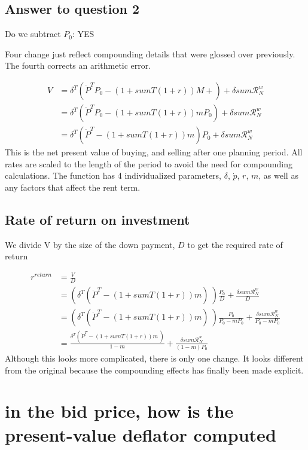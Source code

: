 \subsection{Answer to question 2} 
Do we subtract $P_0$: YES 

Four change just reflect compounding details that were glossed over previously. The fourth corrects an arithmetic error.

\begin{align}
V &= \delta^T \left(\dot P^T P_0- (1 + sumT(1+r))M +  \right) +\delta sum\mathcal{R}^w_N   \\
&= \delta^T \left(\dot P^T P_0 - (1 + sumT(1+r))mP_0\right)  +      \delta sum\mathcal{R}^w_N \label{first_sub}\\
  &= \delta^T \left(\dot P^T    - (1 + sumT(1+r))m    \right) P_0 + \delta sum\mathcal{R}^w_N 
\end{align}
This is the net present value of buying, and selling after one planning period. All rates are scaled to the length of the period to avoid the need for compounding calculations. The function has 4 individualized  parameters, $\delta$, $\dot p$, $r$, $m$, as well as any factors that affect the rent term.


\subsection{Rate of return on investment}
We divide V by the size of the down payment, $D$ to get the required rate of return  

\begin{align}
r^{return} 
  &= \frac{V}{D}  \nonumber \\
  &= \left(\delta^T \left(\dot P^T - (1 + sumT(1+r))m\right) \ \right) \frac{P_0}{D}  + \frac{\delta sum\mathcal{R}^w_N}{D}      \nonumber \\
  &= \left(\delta^T \left(\dot P^T - (1 + sumT(1+r))m \right) \ \right)\frac{P_0}{P_0-mP_0} +  \frac{\delta sum\mathcal{R}^w_N }{P_0-mP_0}  \\ 
  &= \frac{\delta^T \left(\dot P^T - (1 + sumT(1+r))m\ \right) }{1-m} +\frac{\delta sum\mathcal{R}^w_N }{(1-m)P_0}\label{revised}
\end{align}
Although this looks more complicated, there is only one change. It looks different from the original because the compounding effects has finally been made explicit.



\section{in the bid price, how is the present-value deflator computed}

